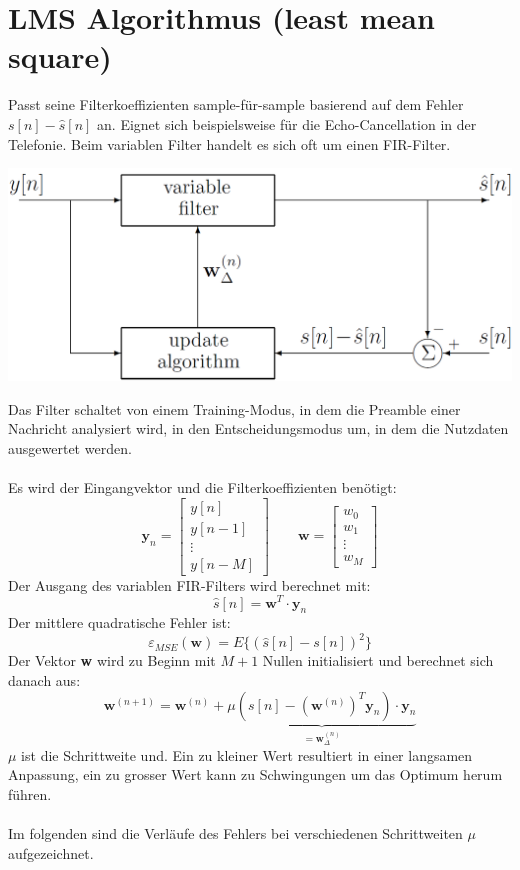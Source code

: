 \section{LMS Algorithmus (least mean square)}
Passt seine Filterkoeffizienten sample-für-sample basierend auf dem Fehler $s[n]-\hat{s}[n]$ an.
Eignet sich beispielsweise für die Echo-Cancellation in der Telefonie. Beim variablen Filter handelt  
es sich oft um einen FIR-Filter.
\begin{center}
	\includegraphics[width=.525\textwidth]{../fig/lms_adaptive_modell}
\end{center}
Das Filter schaltet von einem Training-Modus, in dem die Preamble einer Nachricht analysiert wird,
in den Entscheidungsmodus um, in dem die Nutzdaten ausgewertet werden.\\\\ 
Es wird der Eingangvektor und die Filterkoeffizienten benötigt:
\[ \textbf{y}_n = \begin{bmatrix}y[n] \\ y[n-1] \\ \vdots \\ y[n-M]
	\end{bmatrix} \qquad \textbf{w} = \begin{bmatrix}
		w_0 \\ w_1 \\ \vdots \\ w_M	\end{bmatrix} \]
Der Ausgang des variablen FIR-Filters wird berechnet mit:
\[ \hat{s}[n] = \textbf{w}^T\cdot \textbf{y}_n \]
Der mittlere quadratische Fehler ist:
\[ \varepsilon_{MSE}(\textbf{w}) = E \{ (\hat{s}[n]-s[n])^2 \} \]
Der Vektor \textbf{w} wird zu Beginn mit $M+1$ Nullen initialisiert und berechnet sich danach aus:
\[ \textbf{w}^{(n+1)} = \textbf{w}^{(n)} + \underbrace{\mu\left( s[n] - 
	\left( \textbf{w}^{(n)}\right)^T\textbf{y}_n\right)\cdot\textbf{y}_n}_
	{=\textbf{w}_\Delta^{(n)}} \]
$\mu$ ist die Schrittweite und. Ein zu kleiner Wert resultiert in einer langsamen Anpassung, 
ein zu grosser Wert kann zu Schwingungen um das Optimum herum führen.\\\\
Im folgenden sind die Verläufe des Fehlers bei verschiedenen Schrittweiten $\mu$ aufgezeichnet.
